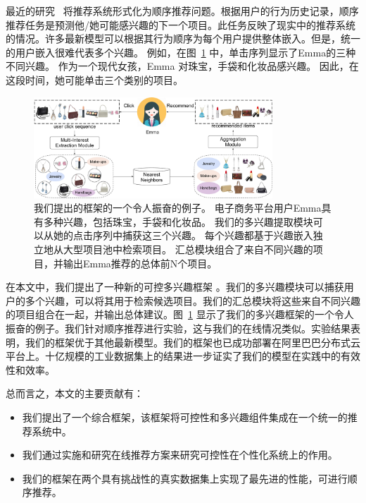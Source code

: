 最近的研究~\cite{kang2018self,chen2018sequential,lv2019sdm} 将推荐系统形式化为顺序推荐问题。根据用户的行为历史记录，顺序推荐任务是预测他/她可能感兴趣的下一个项目。此任务反映了现实中的推荐系统的情况。许多最新模型可以根据其行为顺序为每个用户提供整体嵌入。但是，统一的用户嵌入很难代表多个兴趣。 例如，在图~\ref{fig:multiple_interest} 中，单击序列显示了Emma的三种不同兴趣。 作为一个现代女孩，Emma 对珠宝，手袋和化妆品感兴趣。 因此，在这段时间，她可能单击三个类别的项目。


\begin{figure}
    \centering
    \includegraphics[width=0.8\textwidth]{figures/multi-interest-overview.pdf}
    \caption{我们提出的框架的一个令人振奋的例子。 电子商务平台用户Emma具有多种兴趣，包括珠宝，手袋和化妆品。 我们的多兴趣提取模块可以从她的点击序列中捕获这三个兴趣。 每个兴趣都基于兴趣嵌入独立地从大型项目池中检索项目。 汇总模块组合了来自不同兴趣的项目，并输出Emma推荐的总体前N个项目。 }
    \label{fig:multiple_interest}
\end{figure}

在本文中，我们提出了一种新的可控多兴趣框架 \model。我们的多兴趣模块可以捕获用户的多个兴趣，可以将其用于检索候选项目。我们的汇总模块将这些来自不同兴趣的项目组合在一起，并输出总体建议。图~\ref{fig:multiple_interest} 显示了我们的多兴趣框架的一个令人振奋的例子。我们针对顺序推荐进行实验，这与我们的在线情况类似。实验结果表明，我们的框架优于其他最新模型。我们的框架也已成功部署在阿里巴巴分布式云平台上。十亿规模的工业数据集上的结果进一步证实了我们的模型在实践中的有效性和效率。

总而言之，本文的主要贡献有：
\begin{itemize}
    \item 我们提出了一个综合框架，该框架将可控性和多兴趣组件集成在一个统一的推荐系统中。
    \item 我们通过实施和研究在线推荐方案来研究可控性在个性化系统上的作用。
    \item 我们的框架在两个具有挑战性的真实数据集上实现了最先进的性能，可进行顺序推荐。
\end{itemize}

